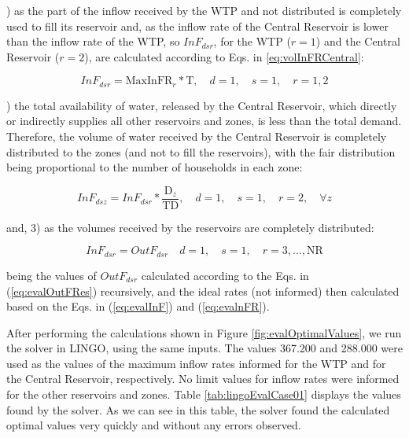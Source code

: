 \documentclass{singlecol}
\theoremstyle{TH}{
\newtheorem{lemma}{Lemma}
\newtheorem{theorem}[lemma]{Theorem}
\newtheorem{corrolary}[lemma]{Corrolary}
\newtheorem{conjecture}[lemma]{Conjecture}
\newtheorem{proposition}[lemma]{Proposition}
\newtheorem{claim}[lemma]{Claim}
\newtheorem{stheorem}[lemma]{Wrong Theorem}
\newtheorem{algorithm}{Algorithm}
}
\theoremstyle{THrm}{
\newtheorem{definition}{Definition}[section]
\newtheorem{question}{Question}[section]
\newtheorem{remark}{Remark}
\newtheorem{scheme}{Scheme}
}
\theoremstyle{THhit}{
\newtheorem{case}{Case}[section]
}
\begin{document}
) as the part of the inflow received by the WTP and not distributed is completely used to fill its reservoir and, as the inflow rate of the Central Reservoir is lower than the inflow rate of the WTP, so $InF_{dsr}$, for the WTP ($r=1$) and the Central Reservoir  ($r=2$), are calculated according to Eqs. in \ref{eq:volInFRCentral}: 

\begin{equation}
	InF_{dsr} = \mathrm{MaxInFR}_r * \mathrm{T}, \quad d = 1, \quad s = 1, \quad r = 1,2
	\label{eq:volInFRCentral}
\end{equation}

) the total availability of water, released by the Central Reservoir, which directly or indirectly supplies all other reservoirs and zones, is less than the total demand. Therefore, the volume of water received by the Central Reservoir is completely distributed to the zones (and not to fill the reservoirs), with the fair distribution being proportional to the number of households in each zone: 

\begin{equation}
	InF_{dsz} = InF_{dsr} * \dfrac{\mathrm{D}_z}{ \mathrm{TD}},
	\quad d = 1, \quad s = 1, \quad r = 2, \quad \forall z  
\end{equation}

\noindent and, 3) as the volumes received by the reservoirs are completely distributed: 

\begin{equation}
	InF_{dsr} = OutF_{dsr} \quad d = 1, \quad s = 1, \quad r=3, ..., \mathrm{NR}
\end{equation}

\noindent being the values of $OutF_{dsr}$ calculated according to the Eqs. in (\ref{eq:evalOutFRes}) recursively, and the ideal rates (not informed) then calculated based on the Eqs. in (\ref{eq:evalInF}) and (\ref{eq:evalnFR}).

After performing the calculations shown in Figure \ref{fig:evalOptimalValues}, we run the solver in LINGO, using the same inputs. The values 367.200 and 288.000 were used as the values of the maximum inflow rates informed for the WTP and for the Central Reservoir, respectively. No limit values for inflow rates were informed for the other reservoirs and zones. Table \ref{tab:lingoEvalCase01} displays the values found by the solver. As we can see in this table, the solver found the calculated optimal values very quickly and without any errors observed. 
\end{document}
